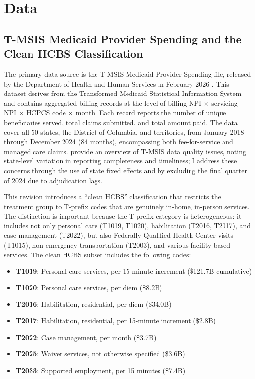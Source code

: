 \documentclass[12pt]{article}
\begin{document}
\section{Data}

\subsection{T-MSIS Medicaid Provider Spending and the Clean HCBS Classification}
\label{sec:data_hcbs}

The primary data source is the T-MSIS Medicaid Provider Spending file, released by the Department of Health and Human Services in February 2026 \citep{hhs2026tmsis}. This dataset derives from the Transformed Medicaid Statistical Information System and contains aggregated billing records at the level of billing NPI $\times$ servicing NPI $\times$ HCPCS code $\times$ month. Each record reports the number of unique beneficiaries served, total claims submitted, and total amount paid. The data cover all 50 states, the District of Columbia, and territories, from January 2018 through December 2024 (84 months), encompassing both fee-for-service and managed care claims. \citet{macpac2021tmsis} provide an overview of T-MSIS data quality issues, noting state-level variation in reporting completeness and timeliness; I address these concerns through the use of state fixed effects and by excluding the final quarter of 2024 due to adjudication lags.

This revision introduces a ``clean HCBS'' classification that restricts the treatment group to T-prefix codes that are genuinely in-home, in-person services. The distinction is important because the T-prefix category is heterogeneous: it includes not only personal care (T1019, T1020), habilitation (T2016, T2017), and case management (T2022), but also Federally Qualified Health Center visits (T1015), non-emergency transportation (T2003), and various facility-based services. The clean HCBS subset includes the following codes:

\begin{itemize}
\item \textbf{T1019}: Personal care services, per 15-minute increment (\$121.7B cumulative)
\item \textbf{T1020}: Personal care services, per diem (\$8.2B)
\item \textbf{T2016}: Habilitation, residential, per diem (\$34.0B)
\item \textbf{T2017}: Habilitation, residential, per 15-minute increment (\$2.8B)
\item \textbf{T2022}: Case management, per month (\$3.7B)
\item \textbf{T2025}: Waiver services, not otherwise specified (\$3.6B)
\item \textbf{T2033}: Supported employment, per 15 minutes (\$7.4B)
\end{itemize}
\end{document}
